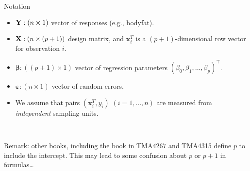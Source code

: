 \documentclass[
  10pt,
  ignorenonframetext,
]{beamer}
\providecommand{\tightlist}{%
  \setlength{\itemsep}{0pt}\setlength{\parskip}{0pt}}
\begin{document}
\begin{frame}
\begin{block}{Notation}
\protect\hypertarget{notation}{}
\(~\)

\begin{itemize}
\tightlist
\item
  \({\bf Y}: (n \times 1)\) vector of responses (e.g., bodyfat).
\end{itemize}

\vspace{2mm}

\begin{itemize}
\tightlist
\item
  \({\bf X}: (n \times (p+1))\) design matrix, and
  \({\boldsymbol x}_i^T\) is a \((p+1)\)-dimensional row vector for
  observation \(i\).
\end{itemize}

\vspace{2mm}

\begin{itemize}
\tightlist
\item
  \({\boldsymbol \beta}: ((p+1) \times 1)\) vector of regression
  parameters \((\beta_0,\beta_1,\ldots,\beta_p)^\top\).
\end{itemize}

\vspace{2mm}

\begin{itemize}
\tightlist
\item
  \({\boldsymbol \varepsilon}: (n\times 1)\) vector of random errors.
\end{itemize}

\vspace{2mm}

\begin{itemize}
\tightlist
\item
  We assume that pairs \(({\boldsymbol x}_i^T,y_i)\) \((i=1,...,n)\) are
  measured from \emph{independent} sampling units.
\end{itemize}

\(~\)

Remark: other books, including the book in TMA4267 and TMA4315 define
\(p\) to include the intercept. This may lead to some confusion about
\(p\) or \(p+1\) in formulas\ldots{}
\end{block}
\end{frame}
\end{document}
